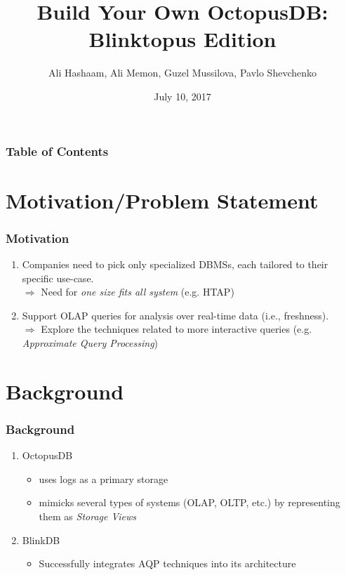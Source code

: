 \documentclass{beamer}
\title{Build Your Own OctopusDB: Blinktopus Edition}
\author{Ali Hashaam, Ali Memon, Guzel Mussilova, Pavlo Shevchenko}
\date{July 10, 2017}
\institute{Scientific Project: Databases for Multi-Dimensional Data, Genomics and Modern Hardware}
\begin{document}
\begin{frame}[plain]
 \titlepage
\end{frame}

\begin{frame}
\frametitle{Table of Contents}
\tableofcontents
\end{frame}

\section{Motivation/Problem Statement}
\begin{frame}
\frametitle{Motivation}
\begin{enumerate}
\item{Companies need to pick only  specialized DBMSs, each tailored to their specific use-case. \\ \pause
$\Rightarrow$ Need for \emph{one size fits all system} (e.g. HTAP)}
\pause
\item{Support OLAP queries for analysis over real-time data (i.e., freshness). \\ \pause
$\Rightarrow$ Explore the techniques related to more interactive queries (e.g. \emph{Approximate Query Processing})}
\end{enumerate}
\end{frame}

\section{Background}
\begin{frame}
\frametitle{Background}
\begin{enumerate}
\item{OctopusDB}
\begin{itemize}
\item{uses logs as a primary storage}
\item{mimicks several types of systems (OLAP, OLTP, etc.) by representing them as \emph{Storage Views}}
\end{itemize}
\pause
\item{BlinkDB}
\begin{itemize}
\item{Successfully integrates AQP techniques into its architecture}
\end{itemize}
\end{enumerate}
\end{frame}
\end{document}
